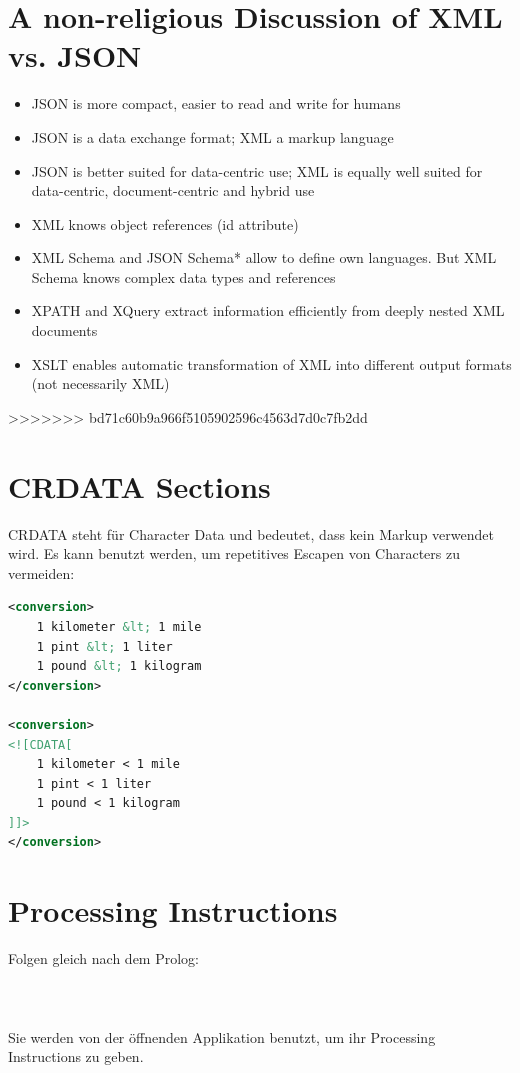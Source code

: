\section{A non-religious Discussion of XML vs. JSON}
\begin{itemize}
\item JSON is more compact, easier to read and write for humans
\item JSON is a data exchange format; XML a markup language
\item JSON is better suited for data-centric use; XML is equally well suited for data-centric, document-centric and hybrid use
\item XML knows object references (id attribute)
\item XML Schema and JSON Schema* allow to define own languages.
But XML Schema knows complex data types and references
\item XPATH and XQuery extract information efficiently from deeply nested XML documents
\item XSLT enables automatic transformation of XML into different output formats (not necessarily XML)
\end{itemize}
>>>>>>> bd71c60b9a966f5105902596c4563d7d0c7fb2dd

\section{CRDATA Sections}
CRDATA steht für Character Data und bedeutet, dass kein Markup verwendet wird. Es kann benutzt werden, um repetitives Escapen von Characters zu vermeiden:
\begin{lstlisting}[language=XML, caption=CRDATA]
<conversion>
	1 kilometer &lt; 1 mile
	1 pint &lt; 1 liter
	1 pound &lt; 1 kilogram 
</conversion>

<conversion>
<![CDATA[
	1 kilometer < 1 mile
	1 pint < 1 liter
	1 pound < 1 kilogram
]]>
</conversion>

\end{lstlisting}

\section{Processing Instructions}
Folgen gleich nach dem Prolog:\\

\\

\\\\
Sie werden von der öffnenden Applikation benutzt, um ihr Processing Instructions zu geben.

